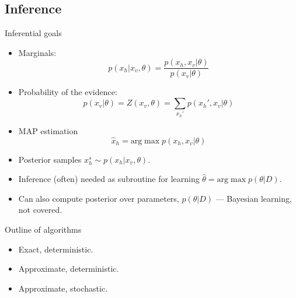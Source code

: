 \documentclass[10pt,mathserif]{beamer}
\begin{document}
\subsection{Inference}
\begin{frame}{Inferential goals}
\begin{itemize}
    \item Marginals:
    \begin{equation}
        p(x_h|x_v,\theta) = \frac{p(x_h, x_v |\theta)}{p(x_v|\theta)}
    \end{equation}
    
    \item Probability of the evidence:
    \begin{equation}
        p(x_v|\theta) = Z(x_v,\theta) = \sum_{x_h'} p(x_h',x_v|\theta)
    \end{equation}
    
    \item MAP estimation
    \begin{equation}
        \hat{x}_h = \text{arg}\max p(x_h,x_v|\theta)
    \end{equation}
    
    \item Posterior samples $x_h^s \sim p(x_h|x_v, \theta)$.
    \item Inference (often) needed as subroutine for learning $\hat{\theta} = \text{arg}\max p(\theta|D)$.
    \item Can also compute posterior over parameters, $p(\theta|D)$ — Bayesian learning, not covered.
\end{itemize}
\end{frame}

\begin{frame}{Outline of algorithms}
\begin{itemize}
    \item Exact, deterministic.
    \item Approximate, deterministic.
    \item Approximate, stochastic.
\end{itemize}
\end{frame}
\end{document}
